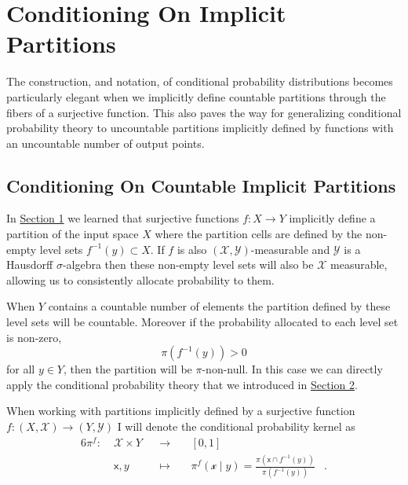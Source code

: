 \documentclass[
  letterpaper,
  DIV=11,
  numbers=noendperiod]{scrartcl}
\begin{document}
\section{Conditioning On Implicit
Partitions}\label{conditioning-on-implicit-partitions}

The construction, and notation, of conditional probability distributions
becomes particularly elegant when we implicitly define countable
partitions through the fibers of a surjective function. This also paves
the way for generalizing conditional probability theory to uncountable
partitions implicitly defined by functions with an uncountable number of
output points.

\subsection{Conditioning On Countable Implicit
Partitions}\label{conditioning-on-countable-implicit-partitions}

In \hyperref[sec:partitions]{Section 1} we learned that surjective
functions \(f : X \rightarrow Y\) implicitly define a partition of the
input space \(X\) where the partition cells are defined by the non-empty
level sets \(f^{-1}(y) \subset X\). If \(f\) is also
\((\mathcal{X}, \mathcal{Y})\)-measurable and \(\mathcal{Y}\) is a
Hausdorff \(\sigma\)-algebra then these non-empty level sets will also
be \(\mathcal{X}\) measurable, allowing us to consistently allocate
probability to them.

When \(Y\) contains a countable number of elements the partition defined
by these level sets will be countable. Moreover if the probability
allocated to each level set is non-zero, \[
\pi( f^{-1}(y) ) > 0
\] for all \(y \in Y\), then the partition will be \(\pi\)-non-null. In
this case we can directly apply the conditional probability theory that
we introduced in \hyperref[sec:explicit-conditional]{Section 2}.

When working with partitions implicitly defined by a surjective function
\(f : (X, \mathcal{X}) \rightarrow (Y, \mathcal{Y})\) I will denote the
conditional probability kernel as \begin{alignat*}{6}
\pi^{f} :\; &\mathcal{X} \times Y& &\rightarrow& \; &[0, 1]&
\\
&\mathsf{x}, y& &\mapsto&
&\pi^{f} ( \mathcal{x} \mid y ) =
 \frac{ \pi(\mathsf{x} \cap f^{-1}(y)) }{ \pi(f^{-1}(y)) } &.
\end{alignat*}
\end{document}
